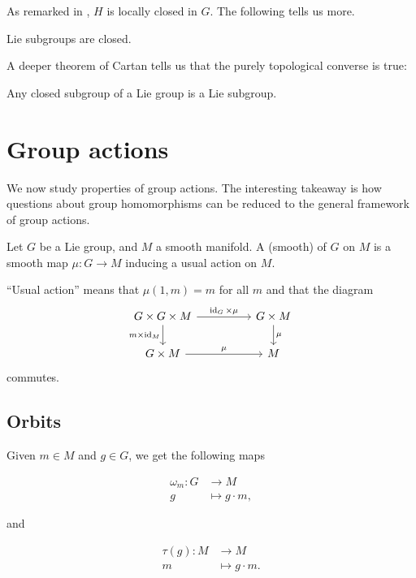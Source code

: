 \documentclass[12pt]{article}
\begin{document}
As remarked in , $H$ is locally closed in $G$. The following tells us more.
\begin{thm}
	Lie subgroups are closed.
\end{thm}

A deeper theorem of Cartan tells us that the purely topological converse is true:
\begin{thm}[Cartan]
	Any closed subgroup of a Lie group is a Lie subgroup.
\end{thm}

\section{Group actions}

We now study properties of group actions. The interesting takeaway is how questions about group homomorphisms can be reduced to the general framework of group actions.

\begin{defn}
	Let $G$ be a Lie group, and $M$ a smooth manifold. 
	A (smooth)  of $G$ on $M$ is a smooth map $\mu \colon G \to M$ inducing a usual action on $M$.
\end{defn}
``Usual action'' means that $\mu(1, m) = m$ for all $m$ and that the diagram
\begin{equation*} 
	\begin{tikzcd}
		G \times G \times M \arrow[rr, "\id_{G} \times \mu"] \arrow[d, "m \times \id_{M}"'] && G \times M \arrow[d, "\mu"] \\
		G \times M \arrow[rr, "\mu"] && M
	\end{tikzcd}
\end{equation*}
commutes.

\subsection{Orbits}

Given $m \in M$ and $g \in G$, we get the following maps

\begin{align*} 
	\omega_{m} \colon G & \to M \\
	g & \mapsto g \cdot m,
\end{align*}

and

\begin{align*} 
	\tau(g) \colon M & \to M \\
	m & \mapsto g \cdot m.
\end{align*}
\end{document}
